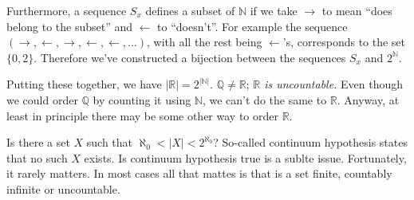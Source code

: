 \documentclass[11pt,%
]{memoir}
\newenvironment{eqna}{\begin{IEEEeqnarray}{c}}{\end{IEEEeqnarray}\ignorespacesafterend}
\newcommand{\NN}{\mathbb{N}}
\newcommand{\RR}{\mathbb{R}}
\newcommand{\QQ}{\mathbb{Q}}
\begin{document}
Furthermore, a sequence \(S_x\) defines a subset of \(\NN\) if we take \(\rightarrow\) to mean ``does belong to the subset'' and \(\leftarrow\) to ``doesn't''. For example the sequence \((\rightarrow,\leftarrow,\rightarrow,\leftarrow,\leftarrow,\dotsc)\), with all the rest being \(\leftarrow\)'s, corresponds to the set \(\lbrace0,2\rbrace\). Therefore we've constructed a bijection between the sequences \(S_x\) and \(2^\NN\).

Putting these together, we have \(|\RR|=2^{|\NN|}\). \(\QQ\neq\RR\); \emph{\(\RR\) is uncountable.} Even though we could order \(\QQ\) by counting it using \(\NN\), we can't do the same to \(\RR\). Anyway, at least in principle there may be some other way to order \(\RR\).

Is there a set \(X\) such that \(\aleph_0<|X|<2^{\aleph_0}\)? So-called continuum hypothesis states that no such \(X\) exists. Is continuum hypothesis true is a sublte issue. Fortunately, it rarely matters. In most cases all that mattes is that is a set finite, countably infinite or uncountable.

    
\end{document}
